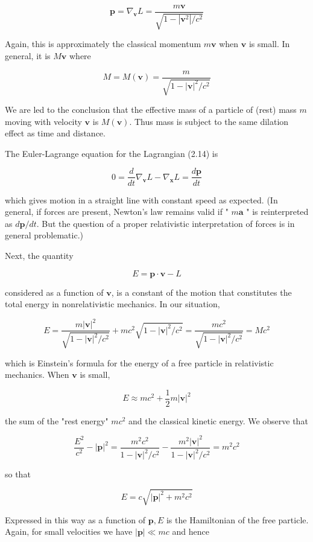 \documentclass[10pt, letterpaper]{article}
\begin{document}
$$
\mathbf{p}=\nabla_{\mathbf{v}} L=\frac{m \mathbf{v}}{\sqrt{1-\left|\mathbf{v}^{2}\right| / c^{2}}}
$$

Again, this is approximately the classical momentum $m \mathbf{v}$ when $\mathbf{v}$ is small. In general, it is $M \mathbf{v}$ where

$$
M=M(\mathbf{v})=\frac{m}{\sqrt{1-|\mathbf{v}|^{2} / c^{2}}}
$$

We are led to the conclusion that the effective mass of a particle of (rest) mass $m$ moving with velocity $\mathbf{v}$ is $M(\mathbf{v})$. Thus mass is subject to the same dilation effect as time and distance.

The Euler-Lagrange equation for the Lagrangian (2.14) is

$$
0=\frac{d}{d t} \nabla_{\mathbf{v}} L-\nabla_{\mathbf{x}} L=\frac{d \mathbf{p}}{d t}
$$

which gives motion in a straight line with constant speed as expected. (In general, if forces are present, Newton's law remains valid if " $m \mathbf{a}$ " is reinterpreted as $d \mathbf{p} / d t$. But the question of a proper relativistic interpretation of forces is in general problematic.)

Next, the quantity

$$
E=\mathbf{p} \cdot \mathbf{v}-L
$$

considered as a function of $\mathbf{v}$, is a constant of the motion that constitutes the total energy in nonrelativistic mechanics. In our situation,

$$
E=\frac{m|\mathbf{v}|^{2}}{\sqrt{1-|\mathbf{v}|^{2} / c^{2}}}+m c^{2} \sqrt{1-|\mathbf{v}|^{2} / c^{2}}=\frac{m c^{2}}{\sqrt{1-|\mathbf{v}|^{2} / c^{2}}}=M c^{2}
$$

which is Einstein's formula for the energy of a free particle in relativistic mechanics. When $\mathbf{v}$ is small,

$$
E \approx m c^{2}+\frac{1}{2} m|\mathbf{v}|^{2}
$$

the sum of the "rest energy" $m c^{2}$ and the classical kinetic energy. We observe that

$$
\frac{E^{2}}{c^{2}}-|\mathbf{p}|^{2}=\frac{m^{2} c^{2}}{1-|\mathbf{v}|^{2} / c^{2}}-\frac{m^{2}|\mathbf{v}|^{2}}{1-|\mathbf{v}|^{2} / c^{2}}=m^{2} c^{2}
$$

so that

$$
E=c \sqrt{|\mathbf{p}|^{2}+m^{2} c^{2}}
$$

Expressed in this way as a function of $\mathbf{p}, E$ is the Hamiltonian of the free particle. Again, for small velocities we have $|\mathbf{p}| \ll m c$ and hence
\end{document}
